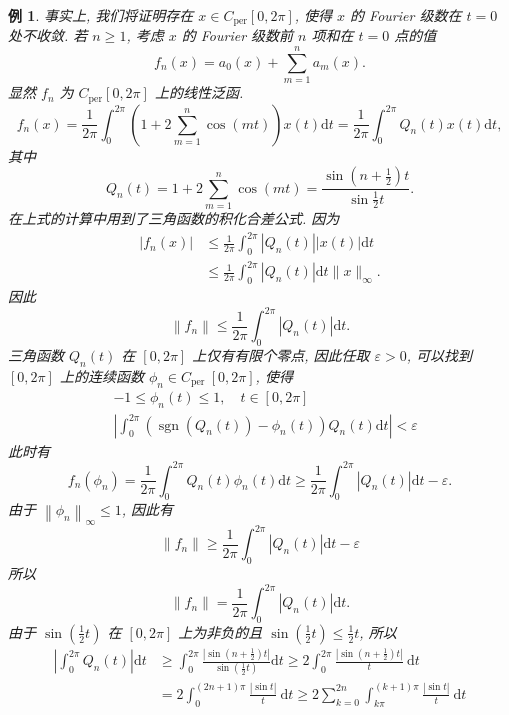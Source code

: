 \documentclass[openany]{ctexbook}
\theoremstyle{kaiti}
\theoremstyle{normal}
\newtheorem{example}{例}[section]
\begin{document}
\begin{example}
事实上, 我们将证明存在 $x \in C_{\mathrm{per}}[0,2 \pi]$, 使得 $x$ 的 Fourier 级数在 $t=0$ 处不收敛. 若 $n \geqslant 1$, 考虑 $x$ 的 Fourier 级数前 $n$ 项和在 $t=0$ 点的值
$$
f_n(x)=a_0(x)+\sum_{m=1}^n a_m(x).
$$
显然 $f_n$ 为 $C_{\mathrm{per}}[0,2 \pi]$ 上的线性泛函.
$$
f_n(x)=\frac{1}{2 \pi} \int_0^{2 \pi}\left(1+2 \sum_{m=1}^n \cos (m t)\right) x(t) \mathrm{d} t=\frac{1}{2 \pi} \int_0^{2 \pi} Q_n(t) x(t) \mathrm{d} t,
$$
其中
$$
Q_n(t)=1+2 \sum_{m=1}^n \cos (m t)=\frac{\sin \left(n+\frac{1}{2}\right) t}{\sin \frac{1}{2} t}.
$$
在上式的计算中用到了三角函数的积化合差公式. 因为
$$
\begin{aligned}
\left|f_n(x)\right| & \leqslant \frac{1}{2 \pi} \int_0^{2 \pi}\left|Q_n(t)\right||x(t)| \mathrm{d} t \\
& \leqslant \frac{1}{2 \pi} \int_0^{2 \pi}\left|Q_n(t)\right| \mathrm{d} t\|x\|_{\infty}.
\end{aligned}
$$
因此
$$
\left\|f_n\right\| \leqslant \frac{1}{2 \pi} \int_0^{2 \pi}\left|Q_n(t)\right| \mathrm{d} t.
$$
三角函数 $Q_n(t)$ 在 $[0,2 \pi]$ 上仅有有限个零点, 因此任取 $\varepsilon>0$, 可以找到 $[0,2 \pi]$ 上的连续函数 $\phi_n \in C_{\text {per }}[0,2 \pi]$, 使得
$$
\begin{aligned}
&-1 \leqslant \phi_n(t) \leqslant 1, \quad t \in[0,2 \pi] \\
&\left|\int_0^{2 \pi}\left(\operatorname{sgn}\left(Q_n(t)\right)-\phi_n(t)\right) Q_n(t) \mathrm{d} t\right|<\varepsilon
\end{aligned}
$$
此时有
$$
f_n\left(\phi_n\right)=\frac{1}{2 \pi} \int_0^{2 \pi} Q_n(t) \phi_n(t) \mathrm{d} t \geqslant \frac{1}{2 \pi} \int_0^{2 \pi}\left|Q_n(t)\right| \mathrm{d} t-\varepsilon.
$$
由于 $\left\|\phi_n\right\|_{\infty} \leqslant 1$, 因此有
$$
\left\|f_n\right\| \geqslant \frac{1}{2 \pi} \int_0^{2 \pi}\left|Q_n(t)\right| \mathrm{d} t-\varepsilon
$$
所以
$$
\left\|f_n\right\|=\frac{1}{2 \pi} \int_0^{2 \pi}\left|Q_n(t)\right| \mathrm{d} t.
$$
由于 $\sin \left(\frac{1}{2} t\right)$ 在 $[0,2 \pi]$ 上为非负的且 $\sin \left(\frac{1}{2} t\right) \leqslant \frac{1}{2} t$, 所以
$$
\begin{aligned}
\left|\int_0^{2 \pi} Q_n(t)\right| \mathrm{d} t & \geqslant \int_0^{2 \pi} \frac{\left|\sin \left(n+\frac{1}{2}\right) t\right|}{\sin \left(\frac{1}{2} t\right)} \mathrm{d} t \geqslant 2 \int_0^{2 \pi} \frac{\left|\sin \left(n+\frac{1}{2}\right) t\right|}{t} \mathrm{~d} t \\
&=2 \int_0^{(2 n+1) \pi} \frac{|\sin t|}{t} \mathrm{~d} t \geqslant 2 \sum_{k=0}^{2 n} \int_{k \pi}^{(k+1) \pi} \frac{|\sin t|}{t} \mathrm{~d} t \\

\end{aligned}$$
\end{example}
\end{document}
